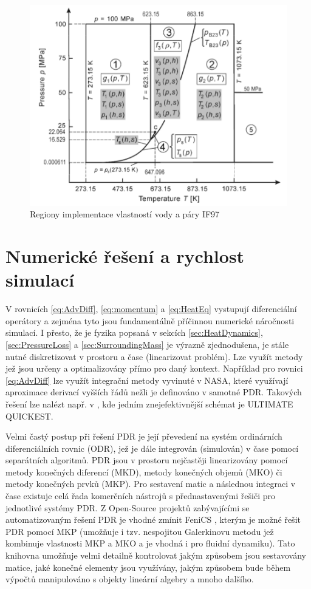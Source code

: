 \begin{figure}[h] \centering \capstart
  \includegraphics[scale=0.7]{figures/IF97}
  \caption{Regiony implementace vlastností vody a páry IF97 }
  \label{fig:IF97}
\end{figure}

\section{Numerické řešení a rychlost simulací}

V rovnicích \ref{eq:AdvDiff}, \ref{eq:momentum} a \ref{eq:HeatEq} vystupují
diferenciální operátory a zejména tyto jsou fundamentálně příčinnou numerické
náročnosti simulací. I přesto, že je fyzika popsaná v sekcích
\ref{sec:HeatDynamics}, \ref{sec:PressureLoss} a \ref{sec:SurroundingMass} je
výrazně zjednodušena, je stále nutné diskretizovat v prostoru a čase
(linearizovat problém). Lze využít metody jež jsou určeny a optimalizovány
přímo pro daný kontext. Například pro rovnici \ref{eq:AdvDiff} lze využít
integrační metody vyvinuté v NASA, které využívají aproximace derivací vyšších
řádů nežli je definováno v samotné PDR. Takových řešení lze nalézt např. v 
, kde jedním znejefektivnější schémat je ULTIMATE QUICKEST.

Velmi častý postup při řešení PDR je její převedení na systém ordinárních
diferenciálních rovnic (ODR), jež je dále integrován (simulován) v čase pomocí
separátních algoritmů. PDR jsou v prostoru nejčastěji linearizovány pomocí
metody konečných diferencí (MKD), metody konečných objemů (MKO) či metody
konečných prvků (MKP). Pro sestavení matic a následnou integraci v čase
existuje celá řada komerčních nástrojů s přednastavenými řešiči pro jednotlivé
systémy PDR. Z Open-Source projektů zabývajícími se automatizovaným řešení PDR
je vhodné  zmínit FeniCS , kterým je možné řešit PDR pomocí
MKP (umožňuje i tzv. nespojitou Galerkinovu metodu jež kombinuje vlastnosti MKP
a MKO a je vhodná i pro fluidní dynamiku). Tato knihovna umožňuje velmi 
detailně kontrolovat jakým způsobem jsou sestavovány matice, jaké konečné 
elementy jsou využívány, jakým způsobem bude během výpočtů manipulováno s 
objekty lineární algebry a mnoho dalšího.

